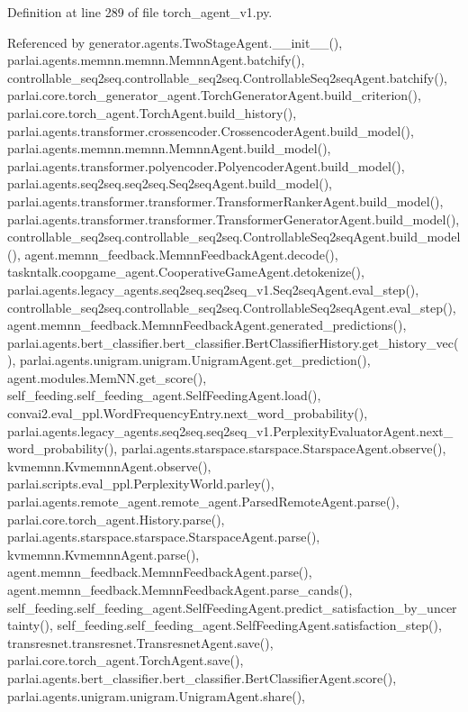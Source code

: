 Definition at line 289 of file torch\+\_\+agent\+\_\+v1.\+py.



Referenced by generator.\+agents.\+Two\+Stage\+Agent.\+\_\+\+\_\+init\+\_\+\+\_\+(), parlai.\+agents.\+memnn.\+memnn.\+Memnn\+Agent.\+batchify(), controllable\+\_\+seq2seq.\+controllable\+\_\+seq2seq.\+Controllable\+Seq2seq\+Agent.\+batchify(), parlai.\+core.\+torch\+\_\+generator\+\_\+agent.\+Torch\+Generator\+Agent.\+build\+\_\+criterion(), parlai.\+core.\+torch\+\_\+agent.\+Torch\+Agent.\+build\+\_\+history(), parlai.\+agents.\+transformer.\+crossencoder.\+Crossencoder\+Agent.\+build\+\_\+model(), parlai.\+agents.\+memnn.\+memnn.\+Memnn\+Agent.\+build\+\_\+model(), parlai.\+agents.\+transformer.\+polyencoder.\+Polyencoder\+Agent.\+build\+\_\+model(), parlai.\+agents.\+seq2seq.\+seq2seq.\+Seq2seq\+Agent.\+build\+\_\+model(), parlai.\+agents.\+transformer.\+transformer.\+Transformer\+Ranker\+Agent.\+build\+\_\+model(), parlai.\+agents.\+transformer.\+transformer.\+Transformer\+Generator\+Agent.\+build\+\_\+model(), controllable\+\_\+seq2seq.\+controllable\+\_\+seq2seq.\+Controllable\+Seq2seq\+Agent.\+build\+\_\+model(), agent.\+memnn\+\_\+feedback.\+Memnn\+Feedback\+Agent.\+decode(), taskntalk.\+coopgame\+\_\+agent.\+Cooperative\+Game\+Agent.\+detokenize(), parlai.\+agents.\+legacy\+\_\+agents.\+seq2seq.\+seq2seq\+\_\+v1.\+Seq2seq\+Agent.\+eval\+\_\+step(), controllable\+\_\+seq2seq.\+controllable\+\_\+seq2seq.\+Controllable\+Seq2seq\+Agent.\+eval\+\_\+step(), agent.\+memnn\+\_\+feedback.\+Memnn\+Feedback\+Agent.\+generated\+\_\+predictions(), parlai.\+agents.\+bert\+\_\+classifier.\+bert\+\_\+classifier.\+Bert\+Classifier\+History.\+get\+\_\+history\+\_\+vec(), parlai.\+agents.\+unigram.\+unigram.\+Unigram\+Agent.\+get\+\_\+prediction(), agent.\+modules.\+Mem\+N\+N.\+get\+\_\+score(), self\+\_\+feeding.\+self\+\_\+feeding\+\_\+agent.\+Self\+Feeding\+Agent.\+load(), convai2.\+eval\+\_\+ppl.\+Word\+Frequency\+Entry.\+next\+\_\+word\+\_\+probability(), parlai.\+agents.\+legacy\+\_\+agents.\+seq2seq.\+seq2seq\+\_\+v1.\+Perplexity\+Evaluator\+Agent.\+next\+\_\+word\+\_\+probability(), parlai.\+agents.\+starspace.\+starspace.\+Starspace\+Agent.\+observe(), kvmemnn.\+Kvmemnn\+Agent.\+observe(), parlai.\+scripts.\+eval\+\_\+ppl.\+Perplexity\+World.\+parley(), parlai.\+agents.\+remote\+\_\+agent.\+remote\+\_\+agent.\+Parsed\+Remote\+Agent.\+parse(), parlai.\+core.\+torch\+\_\+agent.\+History.\+parse(), parlai.\+agents.\+starspace.\+starspace.\+Starspace\+Agent.\+parse(), kvmemnn.\+Kvmemnn\+Agent.\+parse(), agent.\+memnn\+\_\+feedback.\+Memnn\+Feedback\+Agent.\+parse(), agent.\+memnn\+\_\+feedback.\+Memnn\+Feedback\+Agent.\+parse\+\_\+cands(), self\+\_\+feeding.\+self\+\_\+feeding\+\_\+agent.\+Self\+Feeding\+Agent.\+predict\+\_\+satisfaction\+\_\+by\+\_\+uncertainty(), self\+\_\+feeding.\+self\+\_\+feeding\+\_\+agent.\+Self\+Feeding\+Agent.\+satisfaction\+\_\+step(), transresnet.\+transresnet.\+Transresnet\+Agent.\+save(), parlai.\+core.\+torch\+\_\+agent.\+Torch\+Agent.\+save(), parlai.\+agents.\+bert\+\_\+classifier.\+bert\+\_\+classifier.\+Bert\+Classifier\+Agent.\+score(), parlai.\+agents.\+unigram.\+unigram.\+Unigram\+Agent.\+share(), 